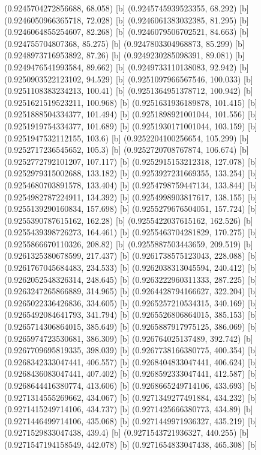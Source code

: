 {{{(0.9245704272856688, 68.058) [b] 
(0.9245745939523355, 68.292) [b] 
(0.9246050966365718, 72.028) [b] 
(0.9246061383032385, 81.295) [b] 
(0.9246064855254607, 82.268) [b] 
(0.9246079506702521, 84.663) [b] 
(0.924755704807368, 85.275) [b] 
(0.9247803304968873, 85.299) [b] 
(0.9248973716953892, 87.26) [b] 
(0.9249230285098391, 89.081) [b] 
(0.9249476541993584, 89.662) [b] 
(0.9249733110138083, 92.942) [b] 
(0.9250903522123102, 94.529) [b] 
(0.9251097966567546, 100.033) [b] 
(0.9251108383234213, 100.41) [b] 
(0.9251364951378712, 100.942) [b] 
(0.9251621519523211, 100.968) [b] 
(0.9251631936189878, 101.415) [b] 
(0.9251888504334377, 101.494) [b] 
(0.9251898921001044, 101.556) [b] 
(0.9251919754334377, 101.689) [b] 
(0.9251930171001044, 103.159) [b] 
(0.9251947532112155, 103.6) [b] 
(0.9252204100256654, 105.299) [b] 
(0.9252717236545652, 105.3) [b] 
(0.9252720708767874, 106.674) [b] 
(0.9252772792101207, 107.117) [b] 
(0.9252915153212318, 127.078) [b] 
(0.9252979315002688, 133.182) [b] 
(0.9253927231669355, 133.254) [b] 
(0.9254680703891578, 133.404) [b] 
(0.9254798759447134, 133.844) [b] 
(0.9254982787224911, 134.392) [b] 
(0.9254998903817617, 138.155) [b] 
(0.9255139290160834, 157.698) [b] 
(0.9255279676504051, 157.724) [b] 
(0.9255390787615162, 162.28) [b] 
(0.9255422037615162, 162.526) [b] 
(0.9255439398726273, 164.461) [b] 
(0.9255463704281829, 170.275) [b] 
(0.9255866670110326, 208.82) [b] 
(0.9255887503443659, 209.519) [b] 
(0.9261325380678599, 217.437) [b] 
(0.9261738575123043, 228.088) [b] 
(0.9261767045684483, 234.533) [b] 
(0.9262038313045594, 240.412) [b] 
(0.9262052548326314, 248.645) [b] 
(0.9263222960311333, 287.225) [b] 
(0.9263247265866889, 314.965) [b] 
(0.9264428794166627, 322.204) [b] 
(0.9265022336426836, 334.605) [b] 
(0.9265257210534315, 340.169) [b] 
(0.9265492084641793, 341.794) [b] 
(0.9265526806864015, 385.153) [b] 
(0.9265714306864015, 385.649) [b] 
(0.9265887917975125, 386.069) [b] 
(0.9265974723530681, 386.309) [b] 
(0.926764025137489, 392.742) [b] 
(0.9267709695819335, 398.039) [b] 
(0.9267738166380775, 400.354) [b] 
(0.9268342333047441, 406.557) [b] 
(0.9268404833047441, 406.624) [b] 
(0.9268436083047441, 407.402) [b] 
(0.9268592333047441, 412.587) [b] 
(0.9268644416380774, 413.606) [b] 
(0.9268665249714106, 433.693) [b] 
(0.9271314555269662, 434.067) [b] 
(0.9271349277491884, 434.232) [b] 
(0.9271415249714106, 434.737) [b] 
(0.9271425666380773, 434.89) [b] 
(0.9271446499714106, 435.068) [b] 
(0.9271449971936327, 435.219) [b] 
(0.9271529833047438, 439.4) [b] 
(0.9271543721936327, 440.255) [b] 
(0.9271547194158549, 442.078) [b] 
(0.9271654833047438, 465.308) [b] 
}}}
